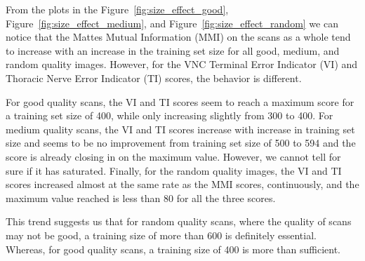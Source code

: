 \documentclass{book}
\begin{document}
	From the plots in the Figure~\ref{fig:size_effect_good}, Figure~\ref{fig:size_effect_medium}, and Figure~\ref{fig:size_effect_random} we can notice that the Mattes Mutual Information (MMI) on the scans as a whole tend to increase with an increase in the training set size for all good, medium, and random quality images. However, for the VNC Terminal Error Indicator (VI) and Thoracic Nerve Error Indicator (TI) scores, the behavior is different.
	
	For good quality scans, the VI and TI scores seem to reach a maximum score for a training set size of 400, while only increasing slightly from 300 to 400. For medium quality scans, the VI and TI scores increase with increase in training set size and seems to be no improvement from training set size of 500 to 594 and the score is already closing in on the maximum value. However, we cannot tell for sure if it has saturated. Finally, for the random quality images, the VI and TI scores increased almost at the same rate as the MMI scores, continuously, and the maximum value reached is less than 80 for all the three scores.
	
	This trend suggests us that for random quality scans, where the quality of scans may not be good, a training size of more than 600 is definitely essential. Whereas, for good quality scans, a training size of 400 is more than sufficient.
	
\end{document}
